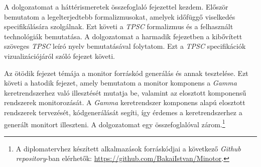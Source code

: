 A dolgozatomat a háttérismeretek összefoglaló fejezettel kezdem.
Először bemutatom a legelterjedtebb formalizmusokat, amelyek időfüggő viselkedés specifikálására szolgálnak.
Ezt követi a \textit{TPSC} formalizmus és a felhasznált technológiák bemutatása.
A dolgozatomat a harmadik fejezetben a kibővített szöveges \textit{TPSC} leíró nyelv bemutatásával folytatom.
Ezt a \textit{TPSC} specifikációk vizualizációjáról szóló fejezet követi.

Az ötödik fejezet témája a monitor forráskód generálás és annak tesztelése.
Ezt követi a hatodik fejezet, amely bemutatom a monitor komponens a \textit{Gamma} keretrendszerhez való illesztését mutatja be, valamint az elosztott komponensű rendszerek monitorozását.
A \textit{Gamma} keretrendszer komponens alapú elosztott rendszerek tervezését, kódgenerálását segíti, így érdemes a keretrendszerhez a generált monitort illeszteni.
A dolgozatomat egy összefoglalóval zárom.\footnote{A diplomatervhez készített alkalmazások forráskódjai a következő \textit{Github} \textit{repository}-ban elérhetők:
\url{https://github.com/BakaiIstvan/Minotor}.}